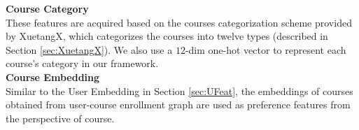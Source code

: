 	\noindent \textbf{Course Category}\\
	These features are acquired based on the courses categorization scheme provided by XuetangX, which categorizes the courses into twelve types (described in Section \ref{sec:XuetangX}). We also use a $12$-dim one-hot vector to represent each course's category in our framework.\\
	
	\noindent \textbf{Course Embedding}\\
	Similar to the User Embedding in Section \ref{sec:UFeat}, the embeddings of courses obtained from user-course enrollment graph are used as preference features from the perspective of course. \\
